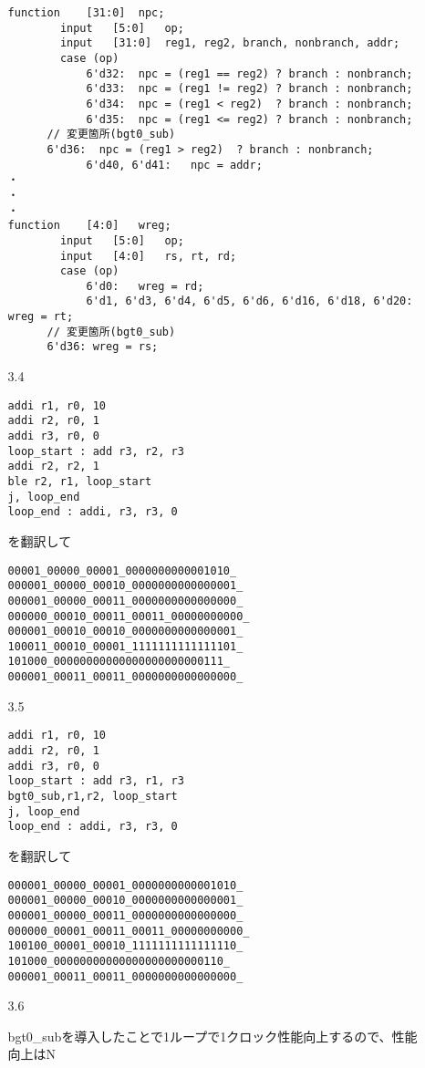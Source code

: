 \documentclass[dvipdfmx]{jsarticle}
\begin{document}
\begin{enumerate}
\begin{enumerate}
\begin{verbatim}
function	[31:0]	npc;
		input	[5:0]	op;
		input	[31:0]	reg1, reg2, branch, nonbranch, addr;
		case (op)
			6'd32:	npc = (reg1 == reg2) ? branch : nonbranch;
			6'd33:	npc = (reg1 != reg2) ? branch : nonbranch;
			6'd34:	npc = (reg1 < reg2)  ? branch : nonbranch; 
			6'd35:	npc = (reg1 <= reg2) ? branch : nonbranch;
      // 変更箇所(bgt0_sub)
      6'd36:  npc = (reg1 > reg2)  ? branch : nonbranch;
			6'd40, 6'd41:	npc = addr;
・
・
・
function	[4:0]	wreg;
		input	[5:0]	op;
		input	[4:0]	rs, rt, rd;
		case (op)
			6'd0:	wreg = rd;
			6'd1, 6'd3, 6'd4, 6'd5, 6'd6, 6'd16, 6'd18, 6'd20:	wreg = rt;
      // 変更箇所(bgt0_sub)
      6'd36: wreg = rs;

\end{verbatim}

\item[3.4]
\begin{verbatim}
addi r1, r0, 10
addi r2, r0, 1
addi r3, r0, 0
loop_start : add r3, r2, r3
addi r2, r2, 1
ble r2, r1, loop_start
j, loop_end
loop_end : addi, r3, r3, 0
\end{verbatim}
を翻訳して
\begin{verbatim}
00001_00000_00001_0000000000001010_
000001_00000_00010_0000000000000001_
000001_00000_00011_0000000000000000_
000000_00010_00011_00011_00000000000_
000001_00010_00010_0000000000000001_
100011_00010_00001_1111111111111101_
101000_00000000000000000000000111_
000001_00011_00011_0000000000000000_
\end{verbatim}

\item[3.5]
\begin{verbatim}
addi r1, r0, 10
addi r2, r0, 1
addi r3, r0, 0
loop_start : add r3, r1, r3
bgt0_sub,r1,r2, loop_start
j, loop_end
loop_end : addi, r3, r3, 0
\end{verbatim}
を翻訳して
\begin{verbatim}
000001_00000_00001_0000000000001010_
000001_00000_00010_0000000000000001_
000001_00000_00011_0000000000000000_
000000_00001_00011_00011_00000000000_
100100_00001_00010_1111111111111110_
101000_00000000000000000000000110_
000001_00011_00011_0000000000000000_
\end{verbatim}

\item[3.6]

bgt0\_subを導入したことで1ループで1クロック性能向上するので、性能向上はN


\end{enumerate}



\end{enumerate}
\end{document}

